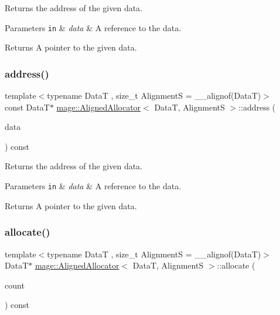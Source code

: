 Returns the address of the given data.


\begin{DoxyParams}[1]{Parameters}
\mbox{\tt in}  & {\em data} & A reference to the data. \\
\hline
\end{DoxyParams}
\begin{DoxyReturn}{Returns}
A pointer to the given data. 
\end{DoxyReturn}
\hypertarget{structmage_1_1_aligned_allocator_afd76c25aa8f6918172c8e0ac8146963a}{}\label{structmage_1_1_aligned_allocator_afd76c25aa8f6918172c8e0ac8146963a} 
\subsubsection{\texorpdfstring{address()}{address()}\hspace{0.1cm}{\footnotesize\ttfamily [2/2]}}
{\footnotesize\ttfamily template$<$typename DataT , size\+\_\+t AlignmentS = \+\_\+\+\_\+alignof(\+Data\+T)$>$ \\
const DataT$\ast$ \hyperlink{structmage_1_1_aligned_allocator}{mage\+::\+Aligned\+Allocator}$<$ DataT, AlignmentS $>$\+::address (\begin{DoxyParamCaption}\item[{const DataT \&}]{data }\end{DoxyParamCaption}) const\hspace{0.3cm}{\ttfamily [noexcept]}}

Returns the address of the given data.


\begin{DoxyParams}[1]{Parameters}
\mbox{\tt in}  & {\em data} & A reference to the data. \\
\hline
\end{DoxyParams}
\begin{DoxyReturn}{Returns}
A pointer to the given data. 
\end{DoxyReturn}
\hypertarget{structmage_1_1_aligned_allocator_aa40b7eb431ac79e6b09bbd9e55906e78}{}\label{structmage_1_1_aligned_allocator_aa40b7eb431ac79e6b09bbd9e55906e78} 
\subsubsection{\texorpdfstring{allocate()}{allocate()}\hspace{0.1cm}{\footnotesize\ttfamily [1/2]}}
{\footnotesize\ttfamily template$<$typename DataT , size\+\_\+t AlignmentS = \+\_\+\+\_\+alignof(\+Data\+T)$>$ \\
DataT$\ast$ \hyperlink{structmage_1_1_aligned_allocator}{mage\+::\+Aligned\+Allocator}$<$ DataT, AlignmentS $>$\+::allocate (\begin{DoxyParamCaption}\item[{size\+\_\+t}]{count }\end{DoxyParamCaption}) const}

